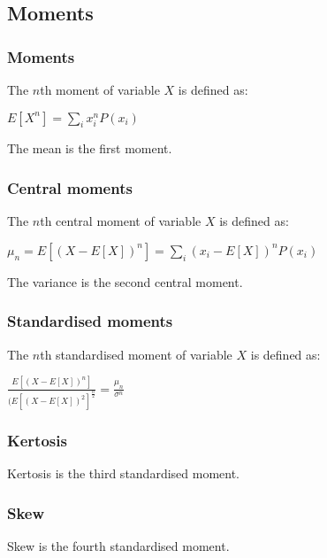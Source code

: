 
\subsection{Moments}

\subsubsection{Moments}

The \(n\)th moment of variable \(X\) is defined as:

$E[X^n]=\sum_i x_i^n P(x_i)$

The mean is the first moment.

\subsubsection{Central moments}

The \(n\)th central moment of variable \(X\) is defined as:

$\mu_n=E[(X-E[X])^n]=\sum_i (x_i-E[X])^n P(x_i)$

The variance is the second central moment.

\subsubsection{Standardised moments}

The \(n\)th standardised moment of variable \(X\) is defined as:

\(\frac{E[(X-E[X])^n]}{(E[(X-E[X])^2]^\frac{n}{2}}=\frac{\mu_n}{\sigma^n}\)

\subsubsection{Kertosis}

Kertosis is the third standardised moment.

\subsubsection{Skew}

Skew is the fourth standardised moment.

